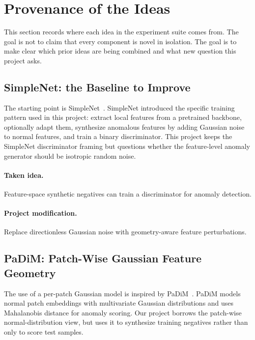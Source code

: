 \documentclass[11pt]{article}
\begin{document}
\section{Provenance of the Ideas}

This section records where each idea in the experiment suite comes from. The
goal is not to claim that every component is novel in isolation. The goal is to
make clear which prior ideas are being combined and what new question this
project asks.

\subsection{SimpleNet: the Baseline to Improve}

The starting point is SimpleNet~\cite{simplenet}. SimpleNet introduced the
specific training pattern used in this project: extract local features from a
pretrained backbone, optionally adapt them, synthesize anomalous features by
adding Gaussian noise to normal features, and train a binary discriminator. This
project keeps the SimpleNet discriminator framing but questions whether the
feature-level anomaly generator should be isotropic random noise.

\paragraph{Taken idea.}
Feature-space synthetic negatives can train a discriminator for anomaly
detection.

\paragraph{Project modification.}
Replace directionless Gaussian noise with geometry-aware feature perturbations.

\subsection{PaDiM: Patch-Wise Gaussian Feature Geometry}

The use of a per-patch Gaussian model is inspired by PaDiM~\cite{padim}. PaDiM
models normal patch embeddings with multivariate Gaussian distributions and uses
Mahalanobis distance for anomaly scoring. Our project borrows the patch-wise
normal-distribution view, but uses it to synthesize training negatives rather
than only to score test samples.
\end{document}
